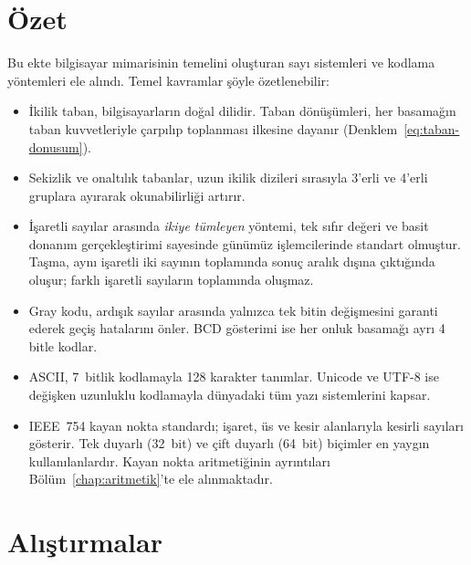 \section*{Özet}

Bu ekte bilgisayar mimarisinin temelini oluşturan sayı sistemleri ve kodlama yöntemleri ele alındı. Temel kavramlar şöyle özetlenebilir:

\begin{itemize}
\item İkilik taban, bilgisayarların doğal dilidir. Taban dönüşümleri, her basamağın taban kuvvetleriyle çarpılıp toplanması ilkesine dayanır (Denklem~\ref{eq:taban-donusum}).

\item Sekizlik ve onaltılık tabanlar, uzun ikilik dizileri sırasıyla 3'erli ve 4'erli gruplara ayırarak okunabilirliği artırır.

\item İşaretli sayılar arasında \emph{ikiye tümleyen} yöntemi, tek sıfır değeri ve basit donanım gerçekleştirimi sayesinde günümüz işlemcilerinde standart olmuştur. Taşma, aynı işaretli iki sayının toplamında sonuç aralık dışına çıktığında oluşur; farklı işaretli sayıların toplamında oluşmaz.

\item Gray kodu, ardışık sayılar arasında yalnızca tek bitin değişmesini garanti ederek geçiş hatalarını önler. BCD gösterimi ise her onluk basamağı ayrı 4 bitle kodlar.

\item ASCII, 7~bitlik kodlamayla 128 karakter tanımlar. Unicode ve UTF-8 ise değişken uzunluklu kodlamayla dünyadaki tüm yazı sistemlerini kapsar.

\item IEEE~754 kayan nokta standardı; işaret, üs ve kesir alanlarıyla kesirli sayıları gösterir. Tek duyarlı (32~bit) ve çift duyarlı (64~bit) biçimler en yaygın kullanılanlardır. Kayan nokta aritmetiğinin ayrıntıları Bölüm~\ref{chap:aritmetik}'te ele alınmaktadır.
\end{itemize}


\section*{Alıştırmalar}
\label{sec:ekA-alistirmalar}

